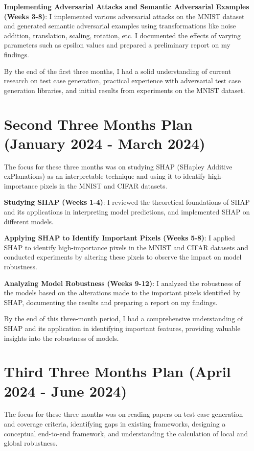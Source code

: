 \textbf{Implementing Adversarial Attacks and Semantic Adversarial Examples (Weeks 3-8)}:
I implemented various adversarial attacks on the MNIST dataset and generated semantic adversarial examples using transformations like noise addition, translation, scaling, rotation, etc. I documented the effects of varying parameters such as epsilon values and prepared a preliminary report on my findings.

By the end of the first three months, I had a solid understanding of current research on test case generation, practical experience with adversarial test case generation libraries, and initial results from experiments on the MNIST dataset. 

\section{Second Three Months Plan (January 2024 - March 2024)}

The focus for these three months was on studying SHAP (SHapley Additive exPlanations) as an interpretable technique and using it to identify high-importance pixels in the MNIST and CIFAR datasets.

\textbf{Studying SHAP (Weeks 1-4)}:
I reviewed the theoretical foundations of SHAP and its applications in interpreting model predictions, and implemented SHAP on different models.

\textbf{Applying SHAP to Identify Important Pixels (Weeks 5-8)}:
I applied SHAP to identify high-importance pixels in the MNIST and CIFAR datasets and conducted experiments by altering these pixels to observe the impact on model robustness.

\textbf{Analyzing Model Robustness (Weeks 9-12)}:
I analyzed the robustness of the models based on the alterations made to the important pixels identified by SHAP, documenting the results and preparing a report on my findings.

By the end of this three-month period, I had a comprehensive understanding of SHAP and its application in identifying important features, providing valuable insights into the robustness of models.

\section{Third Three Months Plan (April 2024 - June 2024)}

The focus for these three months was on reading papers on test case generation and coverage criteria, identifying gaps in existing frameworks, designing a conceptual end-to-end framework, and understanding the calculation of local and global robustness.

